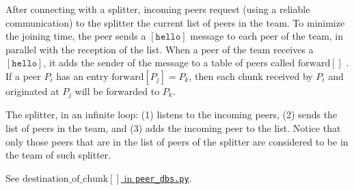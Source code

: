 
\label{sec:joining}

After connecting with a splitter, incoming peers request (using a
reliable communication) to the splitter the current list of peers in
the team. To minimize the joining time, the peer sends a
$[\mathtt{hello}]$ message to each peer of the team, in parallel
with the reception of the list. When a peer of the team receives a
$[\mathtt{hello}]$, it adds the sender of the message to a table of peers
called $\text{forward}[]$ . If a peer $P_i$ has an entry
$\text{forward}[P_j]=P_k$, then each chunk received by $P_i$ and
originated at $P_j$ will be forwarded to $P_k$.


The splitter, in an infinite loop: (1) listens to the incoming peers,
(2) sends the list of peers in the team, and (3) adds the incoming
peer to the list. Notice that only those peers that are in the list of
peers of the splitter are considered to be in the team of such
splitter.

\begin{comment}
\begin{figure*}
  \fig{1000}{10cm}{joining} \caption{Code related to team
    joining.\label{fig:joining}}
\end{figure*}

The new pseudo-code related to joining a team is describen in the
Fig.~\ref{fig:joining}.
\end{comment}

\begin{notex}
  See \href{https://github.com/P2PSP/simulator/blob/f0c73be1817e7d3b816cc61cd2c8e59b17f9a0e6/src/core/splitter_dbs.py#L296}{$\text{destination\_of\_chunk}[]$ in \texttt{peer\_dbs.py}}.
\end{notex}

